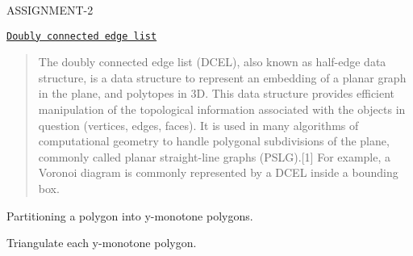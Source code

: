  A\+S\+S\+I\+G\+N\+M\+E\+N\+T-\/2






\begin{DoxyEnumerate}
\item \href{https://en.wikipedia.org/wiki/Doubly_connected_edge_list}{\tt Doubly connected edge list} \begin{quote}
The doubly connected edge list (D\+C\+EL), also known as half-\/edge data structure, is a data structure to represent an embedding of a planar graph in the plane, and polytopes in 3D. This data structure provides efficient manipulation of the topological information associated with the objects in question (vertices, edges, faces). It is used in many algorithms of computational geometry to handle polygonal subdivisions of the plane, commonly called planar straight-\/line graphs (P\+S\+LG).\mbox{[}1\mbox{]} For example, a Voronoi diagram is commonly represented by a D\+C\+EL inside a bounding box. \end{quote}

\item Partitioning a polygon into y-\/monotone polygons.
\item Triangulate each y-\/monotone polygon. 
\end{DoxyEnumerate}

 